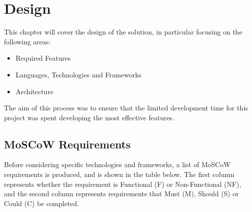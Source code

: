 \chapter{Design}\label{cha:design}
This chapter will cover the design of the solution, in particular focusing on the following areas:

\begin{itemize}
	\item Required Features
	\item Languages, Technologies and Frameworks
	\item Architecture
\end{itemize}

The aim of this process was to ensure that the limited development time for this project was spent developing the most effective features.

\section{MoSCoW Requirements}

Before considering specific technologies and frameworks, a list of MoSCoW requirements is produced, and is shown in the table below. The first column represents whether the requirement is Functional (F) or Non-Functional (NF), and the second column represents requirements that Must (M), Should (S) or Could (C) be completed.


